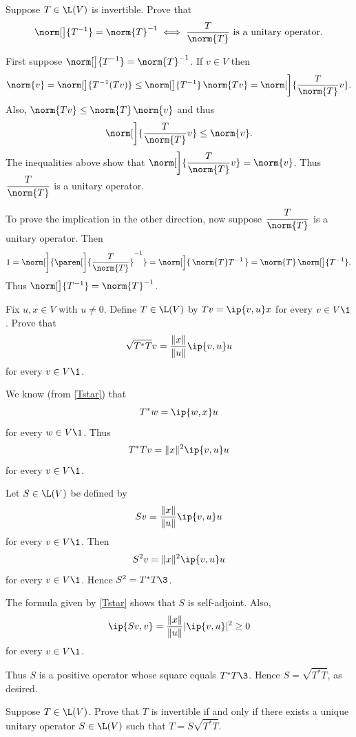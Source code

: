 \exercise
Suppose $T \in \L(V)$ is invertible. Prove that
\[
\norm[\big]{ T^{-1} } = \norm{T}^{-1} \iff \frac{T}{\norm{T}} \text{ is a unitary operator}.
\]
\vspace{-16bp}

\begin{Solution}
First suppose $\displaystyle \norm[\big]{ T^{-1} } = \norm{T}^{-1}$. If $v\in V$ then
\[
\norm{v} = \norm[\big]{ T^{-1}(Tv) } \le \norm[\big]{ T^{-1} } \, \norm{Tv} = \norm[\bigg]{ \frac{T}{\norm{T}}  v }.
\]
Also, $\norm{Tv} \le \norm{T} \, \norm{v}$ and thus
\[
\norm[\bigg]{ \frac{T}{\norm{T}}  v } \le \norm{v}.
\]
The inequalities above show that $\displaystyle \norm[\bigg]{ \frac{T}{\norm{T}}  v } = \norm{v}$. Thus $\displaystyle \frac{T}{\norm{T}}$ is a unitary operator.

To prove the implication in the other direction, now suppose $\displaystyle \frac{T}{\norm{T}}$ is a unitary operator. Then
\[
1 = \norm[\bigg]{ \paren[\bigg]{ \frac{T}{\norm{T}} }^{-1} } = \norm[\Big]{\, \norm{T} T^{-1}\, }= \norm{T} \, \norm[\big]{ T^{-1} }.
\]
Thus $\norm[\big]{ T^{-1} } = \norm{T}^{-1}$.
\end{Solution}

\exercise
Fix $u, x \in V$ with $u \ne 0$. Define $T \in \L(V)$ by
$
Tv = \ip{v, u}x
$
for every $v \in V\1$.  Prove that
\[
\sqrt{T^* T}v = \frac{ \|x\| }{ \|u\| } \ip{v,u} u
\]
for every $v \in V\1$.

\begin{Solution}
We know (from \ref{Tstar}) that
\[
T^* w = \ip{w, x}u
\]
for every $w \in V\1$.  Thus
\[
T^*Tv = \|x\|^2 \ip{v, u} u
\]
for every $v \in V\1$.

Let $S \in \L(V)$ be defined by
\[
Sv = \frac{ \|x\| }{ \|u\| } \ip{v,u} u
\]
for every $v \in V\1$. Then
\[
S^2 v = \|x\|^2 \ip{v, u} u
\]
for every $v \in V\1$. Hence $S^2 = T^*T\3$.

The formula given by \ref{Tstar} shows that $S$ is self-adjoint. Also,
\[
\ip{Sv, v} = \frac{ \|x\| }{ \|u\| } |\ip{v,u}|^2 \ge 0
\]
for every $v \in V\1$.

Thus $S$ is a positive operator whose square equals $T^* T\3$. Hence $S = \sqrt{T^* T}$, as desired.
\end{Solution}

\exercise
Suppose $T \in \L(V)$.  Prove that $T$ is invertible if and only if there exists a
unique unitary operator $S \in \L(V)$ such that $T = S \sqrt{T^* T}$.

